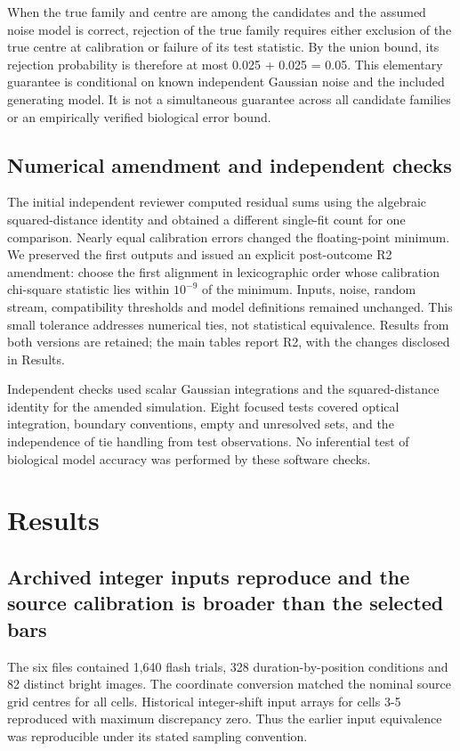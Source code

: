 \documentclass[11pt,letterpaper]{article}
\begin{document}
When the true family and centre are among the candidates and the assumed noise model is correct, rejection of the true family requires either exclusion of the true centre at calibration or failure of its test statistic. By the union bound, its rejection probability is therefore at most 0.025 + 0.025 = 0.05. This elementary guarantee is conditional on known independent Gaussian noise and the included generating model. It is not a simultaneous guarantee across all candidate families or an empirically verified biological error bound.


\subsection{Numerical amendment and independent checks}

The initial independent reviewer computed residual sums using the algebraic squared-distance identity and obtained a different single-fit count for one comparison. Nearly equal calibration errors changed the floating-point minimum. We preserved the first outputs and issued an explicit post-outcome R2 amendment: choose the first alignment in lexicographic order whose calibration chi-square statistic lies within $10^{-9}$ of the minimum. Inputs, noise, random stream, compatibility thresholds and model definitions remained unchanged. This small tolerance addresses numerical ties, not statistical equivalence. Results from both versions are retained; the main tables report R2, with the changes disclosed in Results.


Independent checks used scalar Gaussian integrations and the squared-distance identity for the amended simulation. Eight focused tests covered optical integration, boundary conventions, empty and unresolved sets, and the independence of tie handling from test observations. No inferential test of biological model accuracy was performed by these software checks.


\section{Results}

\subsection{Archived integer inputs reproduce and the source calibration is broader than the selected bars}

The six files contained 1,640 flash trials, 328 duration-by-position conditions and 82 distinct bright images. The coordinate conversion matched the nominal source grid centres for all cells. Historical integer-shift input arrays for cells 3-5 reproduced with maximum discrepancy zero. Thus the earlier input equivalence was reproducible under its stated sampling convention.
\end{document}
